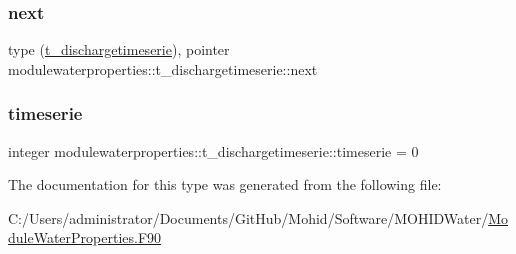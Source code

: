\subsubsection{\texorpdfstring{next}{next}}
{\footnotesize\ttfamily type (\mbox{\hyperlink{structmodulewaterproperties_1_1t__dischargetimeserie}{t\+\_\+dischargetimeserie}}), pointer modulewaterproperties\+::t\+\_\+dischargetimeserie\+::next\hspace{0.3cm}{\ttfamily [private]}}

\mbox{\label{structmodulewaterproperties_1_1t__dischargetimeserie_a9edd5fc611cf2305c1904643070add8f}} 
\subsubsection{\texorpdfstring{timeserie}{timeserie}}
{\footnotesize\ttfamily integer modulewaterproperties\+::t\+\_\+dischargetimeserie\+::timeserie = 0\hspace{0.3cm}{\ttfamily [private]}}



The documentation for this type was generated from the following file\+:\begin{DoxyCompactItemize}
\item 
C\+:/\+Users/administrator/\+Documents/\+Git\+Hub/\+Mohid/\+Software/\+M\+O\+H\+I\+D\+Water/\mbox{\hyperlink{_module_water_properties_8_f90}{Module\+Water\+Properties.\+F90}}\end{DoxyCompactItemize}
